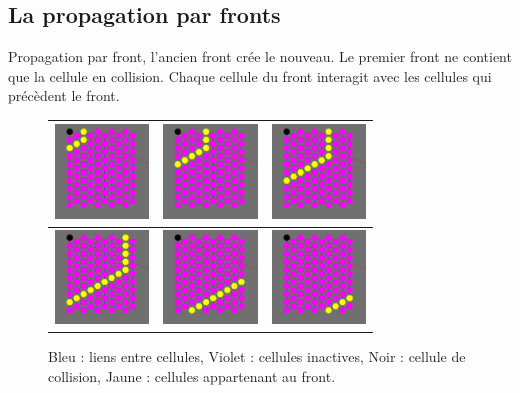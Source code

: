 \documentclass{beamer}
\begin{document}
\subsection{La propagation par fronts}
\begin{frame}
  Propagation par front, l’ancien front crée le nouveau. Le premier front ne contient que la cellule en collision.
  Chaque cellule du front interagit avec les cellules qui précèdent le front.
  \begin{figure}
    \begin{tabular}{|M|M|M|}
      \hline
      \includegraphics[width=2.5cm]{Images/front_1.png} &
      \includegraphics[width=2.5cm]{Images/front_2.png} &
      \includegraphics[width=2.5cm]{Images/front_3.png} \\
      \hline
      \includegraphics[width=2.5cm]{Images/front_4.png} &
      \includegraphics[width=2.5cm]{Images/front_5.png} &
      \includegraphics[width=2.5cm]{Images/front_6.png} \\
      \hline
    \end{tabular}
    \caption{Bleu : liens entre cellules, Violet : cellules inactives, Noir : cellule de collision, Jaune : cellules appartenant au front.}
  \end{figure}
\end{frame}
\end{document}
